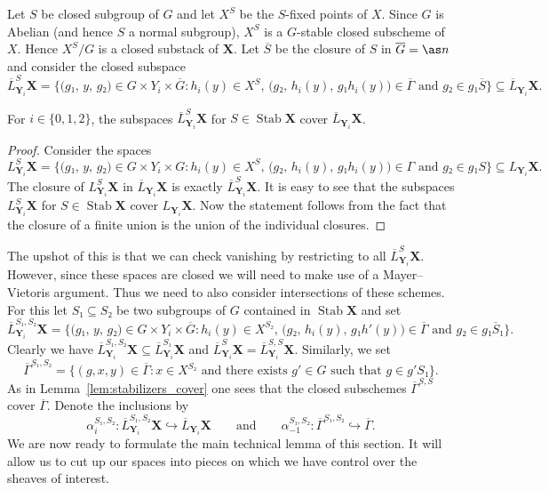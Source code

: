 \documentclass[english]{ck-article}
\let\stack\mathbf
\let\bar\overline
\newcommand\slsY[2][\stack Y]{L_{#1}#2}
\newcommand\sclsY[2][\stack Y]{\overline{L}_{#1}#2}
\newcommand\stablsY[3][\stack Y]{L_{#1}^{#2}#3}
\newcommand\stabclsY[3][\stack Y]{\overline{L}_{#1}^{#2}#3}
\newcommand\schemeh{h'}
\newcommand\Stab{\operatorname{Stab}}
\begin{document}
Let $S$ be closed subgroup of $G$ and let $X^S$ be the $S$-fixed points of $X$.
Since $G$ is Abelian (and hence $S$ a normal subgroup), $X^S$ is a $G$-stable closed subscheme of $X$.
Hence $X^S/G$ is a closed substack of $\stack X$.
Let $\bar S$ be the closure of $S$ in $\bar G = \as n$ and consider the closed subspace
\[
    \stabclsY[\stack Y_i]{S}{\stack X} =
    \biggl\{
        \bigl(g₁,\, y,\, g₂\bigr) ∈ G × Y_i × \bar G : h_i(y) ∈ X^S,\, \bigl(g₂,\, h_i(y),\, g₁h_i(y)\bigr) ∈ \bar Γ \text{ and } g₂ ∈ g₁\bar S
    \biggr\}
    ⊆
    \sclsY[\stack Y_i] \stack X.
\]

\begin{Lem}
    \label{lem:stabilizers_cover}%
    For $i \in \{0,1,2\}$, the subspaces $\stabclsY[\stack Y_i]{S}{\stack X}$ for $S ∈ \Stab\stack X$ cover $\sclsY[\stack Y_i]{\stack X}$.
\end{Lem}

\begin{proof}
    Consider the spaces
    \[
        \stablsY[\stack Y_i]{S}{\stack X} =
        \biggl\{
            \bigl(g₁,\, y,\, g₂\bigr) ∈ G × Y_i × G : h_i(y) ∈ X^S,\, \bigl(g₂,\, h_i(y),\, g₁h_i(y)\bigr) ∈ Γ \text{ and } g₂ ∈ g₁S
        \biggr\}
        \subseteq \slsY[\stack Y_i] \stack X.
    \]
    The closure of $\stablsY[\stack Y_i]{S}{\stack X}$ in $\sclsY[\stack Y_i] \stack X$ is exactly $\stabclsY[\stack Y_i]{S}{\stack X}$.
    It is easy to see that the subspaces $\stablsY[\stack Y_i]{S}{\stack X}$ for $S ∈ \Stab \stack X$ cover $\slsY[\stack Y_i] \stack X$.
    Now the statement follows from the fact that the closure of a finite union is the union of the individual closures.
\end{proof}

The upshot of this is that we can check vanishing by restricting to all $\stabclsY[\stack Y_i]{S}{\stack X}$.
However, since these spaces are closed we will need to make use of a Mayer--Vietoris argument.
Thus we need to also consider intersections of these schemes.
For this let $S₁ \subseteq S₂$ be two subgroups of $G$ contained in $\Stab\stack X$ and set
\[
    \stabclsY[\stack Y_i]{S₁,S₂} \stack X =
    \biggl\{
        \bigl(g₁,\, y,\, g₂\bigr) ∈ G × Y_i × \bar G : h_i(y) ∈ X^{S₂},\, \bigl(g₂,\, h_i(y),\, g₁\schemeh(y)\bigr) ∈ \bar Γ \text{ and } g₂ ∈ g₁\bar S₁
    \biggr\}.
\]
Clearly we have $\stabclsY[\stack Y_i]{S₁,S₂}{\stack X} \subseteq \stabclsY[\stack Y_i]{S₁}{\stack X}$ and $\stabclsY[\stack Y_i]{S}{\stack X} = \stabclsY[\stack Y_i]{S,S}{\stack X}$.
Similarly, we set
\[
    \bar Γ^{S₁,S₂} = \bigl\{ (g,x,y) ∈ \bar Γ : x ∈ X^{S₂} \text{ and there exists $g' ∈ G$ such that $g ∈ g'S₁$}  \bigr\}.
\]
As in Lemma~\ref{lem:stabilizers_cover} one sees that the closed subschemes $\bar Γ^{S,S}$ cover $\bar Γ$.
Denote the inclusions by
\[
    α_i^{S₁,S₂}\colon \stabclsY[\stack Y_i]{S₁,S₂}{\stack X} \hookrightarrow \sclsY[\stack Y_i]{\stack X}
    \qquad\text{and}\qquad
    α_{-1}^{S₁,S₂}\colon \bar Γ^{S₁,S₂} \hookrightarrow \bar Γ.
\]
We are now ready to formulate the main technical lemma of this section.
It will allow us to cut up our spaces into pieces on which we have control over the sheaves of interest.
\end{document}
